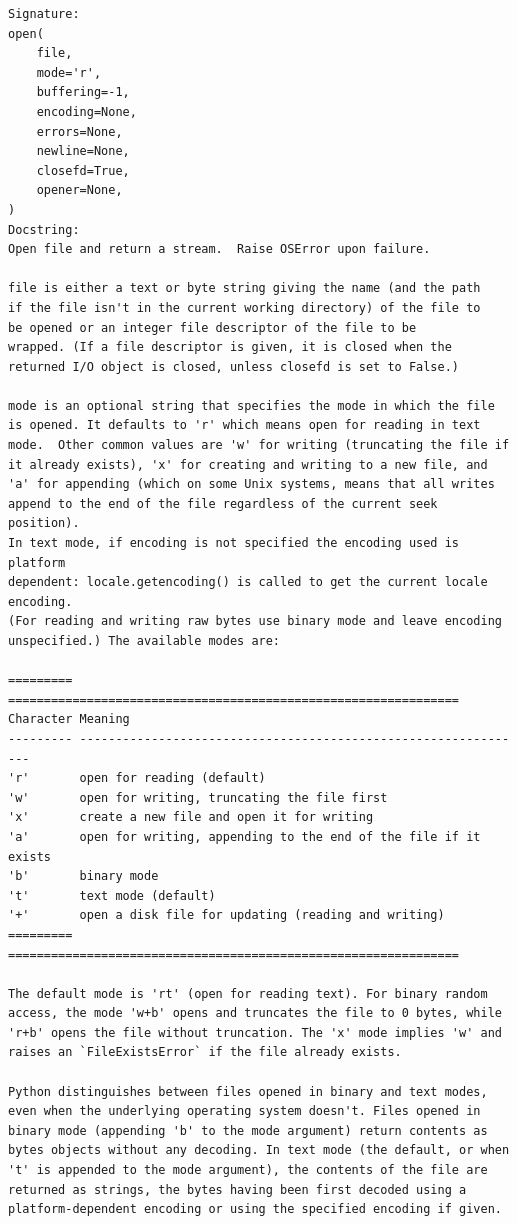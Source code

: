 \documentclass[
  letterpaper,
  DIV=11,
  numbers=noendperiod]{scrreprt}
\begin{document}
\begin{verbatim}
Signature:
open(
    file,
    mode='r',
    buffering=-1,
    encoding=None,
    errors=None,
    newline=None,
    closefd=True,
    opener=None,
)
Docstring:
Open file and return a stream.  Raise OSError upon failure.

file is either a text or byte string giving the name (and the path
if the file isn't in the current working directory) of the file to
be opened or an integer file descriptor of the file to be
wrapped. (If a file descriptor is given, it is closed when the
returned I/O object is closed, unless closefd is set to False.)

mode is an optional string that specifies the mode in which the file
is opened. It defaults to 'r' which means open for reading in text
mode.  Other common values are 'w' for writing (truncating the file if
it already exists), 'x' for creating and writing to a new file, and
'a' for appending (which on some Unix systems, means that all writes
append to the end of the file regardless of the current seek position).
In text mode, if encoding is not specified the encoding used is platform
dependent: locale.getencoding() is called to get the current locale encoding.
(For reading and writing raw bytes use binary mode and leave encoding
unspecified.) The available modes are:

========= ===============================================================
Character Meaning
--------- ---------------------------------------------------------------
'r'       open for reading (default)
'w'       open for writing, truncating the file first
'x'       create a new file and open it for writing
'a'       open for writing, appending to the end of the file if it exists
'b'       binary mode
't'       text mode (default)
'+'       open a disk file for updating (reading and writing)
========= ===============================================================

The default mode is 'rt' (open for reading text). For binary random
access, the mode 'w+b' opens and truncates the file to 0 bytes, while
'r+b' opens the file without truncation. The 'x' mode implies 'w' and
raises an `FileExistsError` if the file already exists.

Python distinguishes between files opened in binary and text modes,
even when the underlying operating system doesn't. Files opened in
binary mode (appending 'b' to the mode argument) return contents as
bytes objects without any decoding. In text mode (the default, or when
't' is appended to the mode argument), the contents of the file are
returned as strings, the bytes having been first decoded using a
platform-dependent encoding or using the specified encoding if given.


\end{verbatim}
\end{document}
